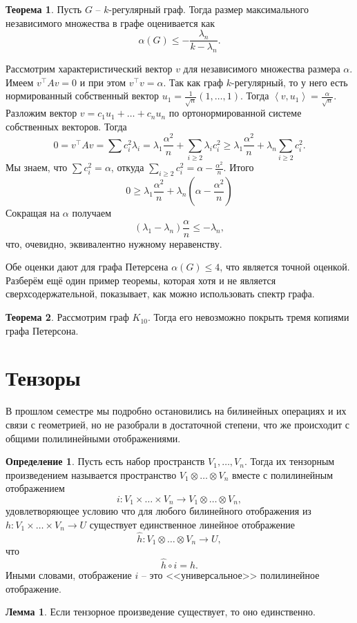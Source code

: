 \documentclass[10pt,a4paper,oneside]{book}
\theoremstyle{definition}
\newtheorem*{defn}{{\color{yellow!20!red} Определение}}
\newtheorem{thm}{{\color{red!40!black} Теорема}}
\newtheorem{lem}{Лемма}
\def\lan{\left\langle }
\def\ran{\right\rangle}
\def\thrm{\begin{thm}}
\def\ethrm{\end{thm}}
\def\dfn{\begin{defn}}
\def\edfn{\end{defn}}
\def\lm{\begin{lem}}
\def\elm{\end{lem}}
\begin{document}
\thrm Пусть $G$ -- $k$-регулярный граф. Тогда размер максимального независимого множества в графе оценивается как $$\alpha(G)\leq -\frac{\lambda_n}{k-\lambda_n}.$$
\ethrm
\proof Рассмотрим характеристический вектор $v$ для независимого множества размера $\alpha$. Имеем $v^{\top}Av=0$ и при этом $v^{\top}v=\alpha$. Так как граф $k$-регулярный, то у него есть нормированный собственный вектор $u_1=\frac{1}{\sqrt{n}}(1,\dots,1)$. Тогда $\lan v,u_1\ran = \frac{\alpha}{\sqrt{n}}$. Разложим вектор $v=c_1u_1 + \dots + c_n u_n$ по ортонормированной системе собственных векторов. Тогда
$$0=v^{\top}Av=\sum c_i^2 \lambda_i= \lambda_1\frac{\alpha^2}{n}+ \sum_{i\geq 2} \lambda_i c_i^2\geq \lambda_1\frac{\alpha^2}{n}+ \lambda_n \sum_{i\geq 2} c_i^2.$$
Мы знаем, что $\sum c_i^2=\alpha$, откуда $\sum_{i\geq 2} c_i^2=\alpha - \frac{\alpha^2}{n}$. Итого 
$$0\geq \lambda_1\frac{\alpha^2}{n}+\lambda_n(\alpha- \frac{\alpha^2}{n})$$
Сокращая на $\alpha$ получаем 
$$(\lambda_1-\lambda_n)\frac{\alpha}{n}\leq -\lambda_n,$$
что, очевидно, эквивалентно нужному неравенству.
\endproof

Обе оценки дают для графа Петерсена $\alpha(G)\leq 4$, что является точной оценкой. Разберём ещё один пример теоремы, которая хотя и не является сверхсодержательной, показывает, как можно использовать спектр графа.

\thrm Рассмотрим граф $K_{10}$. Тогда его невозможно покрыть тремя копиями графа Петерсона.
\ethrm

\section{Тензоры}

В прошлом семестре мы подробно остановились на билинейных операциях и их связи с геометрией, но не разобрали в достаточной степени, что же происходит с общими полилинейными отображениями.

\dfn Пусть есть набор пространств $V_1, \dots,V_n$. Тогда их тензорным произведением называется пространство 
$V_1\otimes \dots \otimes V_n$ вместе с полилинейным отображением
$$i \colon V_1 \times \dots \times V_n \to V_1 \otimes \dots \otimes V_n,$$
удовлетворяющее условию что для любого билинейного отображения из $h\colon V_1\times \dots \times V_n \to U$ существует единственное линейное отображение 
$$\hat{h}\colon V_1\otimes \dots \otimes V_n \to U,$$
что 
$$\hat{h}\circ i=h.$$
Иными словами, отображение $i$ -- это <<универсальное>> полилинейное отображение.
\edfn 


\lm Если тензорное произведение существует, то оно единственно.
\elm
\end{document}
